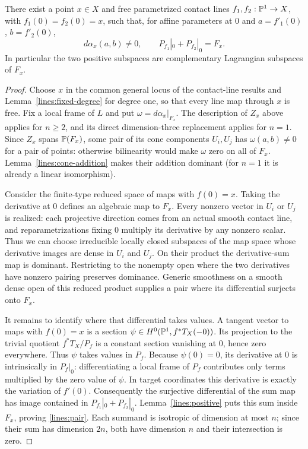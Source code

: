 \begin{proposition}\label{lines:suitable-pair}
There exist a point $x\in X$ and free parametrized contact lines
$f_1,f_2:\mathbb P^1\to X$, with $f_1(0)=f_2(0)=x$, such that, for
affine parameters at $0$ and $a=f'_1(0)$, $b=f'_2(0)$,
\begin{equation}\label{lines:pair}
d\alpha_x(a,b)\neq0,\qquad
P_{f_1}|_0+P_{f_2}|_0=F_x.
\end{equation}
In particular the two positive subspaces are complementary
Lagrangian subspaces of $F_x$.
\end{proposition}

\begin{proof}
Choose $x$ in the common general locus of the contact-line results
and Lemma~\ref{lines:fixed-degree} for degree one, so that every
line map through $x$ is free. Fix a local frame of $L$ and put
$\omega=d\alpha_x|_{F_x}$. The description of $Z_x$ above applies
for $n\geq2$, and its direct dimension-three replacement applies
for $n=1$. Since $Z_x$ spans $\mathbb P(F_x)$, some pair of its cone
components $U_i,U_j$ has $\omega(a,b)\neq0$ for a pair of points:
otherwise bilinearity would make $\omega$ zero on all of $F_x$.
Lemma~\ref{lines:cone-addition} makes their addition dominant
(for $n=1$ it is already a linear isomorphism).

Consider the finite-type reduced space of maps with $f(0)=x$.
Taking the derivative at $0$ defines an algebraic map to $F_x$.
Every nonzero vector in $U_i$ or $U_j$ is realized: each projective
direction comes from an actual smooth contact line, and
reparametrizations fixing $0$ multiply its derivative by any
nonzero scalar. Thus we can choose irreducible locally closed
subspaces of the map space whose derivative images are dense
in $U_i$ and $U_j$. On their product the derivative-sum map
is dominant. Restricting to the nonempty open where the two
derivatives have nonzero pairing preserves dominance.
Generic smoothness on a smooth dense open of this reduced
product supplies a pair where its differential surjects onto
$F_x$.

It remains to identify where that differential takes values.
A tangent vector to maps with $f(0)=x$ is a section
$\psi\in H^0(\mathbb P^1,f^*T_X(-0))$. Its projection to the trivial
quotient $f^*T_X/P_f$ is a constant section vanishing at $0$,
hence zero everywhere. Thus $\psi$ takes values in $P_f$.
Because $\psi(0)=0$, its derivative at $0$ is intrinsically in
$P_f|_0$: differentiating a local frame of $P_f$ contributes
only terms multiplied by the zero value of $\psi$. In target
coordinates this derivative is exactly the variation of
$f'(0)$. Consequently the surjective differential of the
sum map has image contained in $P_{f_1}|_0+P_{f_2}|_0$.
Lemma~\ref{lines:positive} puts this sum inside $F_x$, proving
\eqref{lines:pair}. Each summand is isotropic of dimension at
most $n$; since their sum has dimension $2n$, both have
dimension $n$ and their intersection is zero.
\end{proof}
